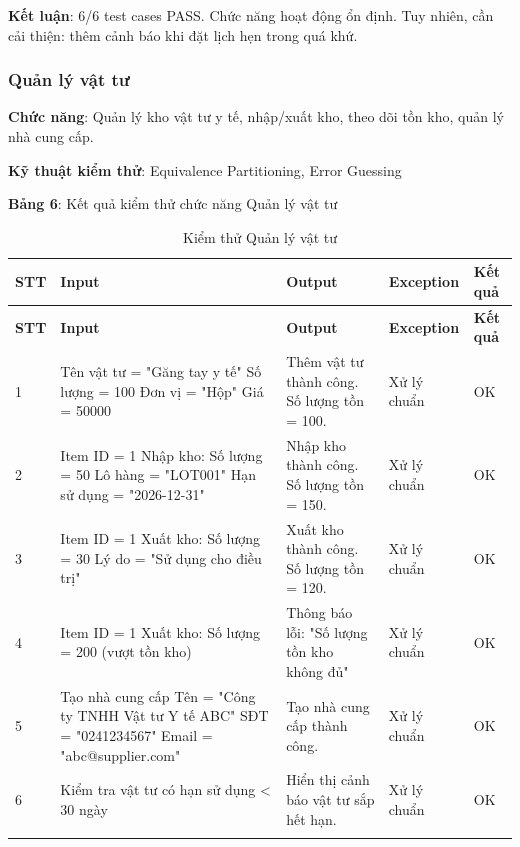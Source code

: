 \textbf{Kết luận}: 6/6 test cases PASS. Chức năng hoạt động ổn định. Tuy nhiên, cần cải thiện: thêm cảnh báo khi đặt lịch hẹn trong quá khứ.

\subsubsection{Quản lý vật tư}

\textbf{Chức năng}: Quản lý kho vật tư y tế, nhập/xuất kho, theo dõi tồn kho, quản lý nhà cung cấp.

\textbf{Kỹ thuật kiểm thử}: Equivalence Partitioning, Error Guessing

\textbf{Bảng 6}: Kết quả kiểm thử chức năng Quản lý vật tư

\begin{longtable}{|p{1cm}|p{5cm}|p{4cm}|p{3cm}|p{1.5cm}|}
\hline
\textbf{STT} & \textbf{Input} & \textbf{Output} & \textbf{Exception} & \textbf{Kết quả} \\
\hline
\endfirsthead

\hline
\textbf{STT} & \textbf{Input} & \textbf{Output} & \textbf{Exception} & \textbf{Kết quả} \\
\hline
\endhead

\hline
\endfoot

1 & Tên vật tư = "Găng tay y tế" \newline Số lượng = 100 \newline Đơn vị = "Hộp" \newline Giá = 50000 & Thêm vật tư thành công. Số lượng tồn = 100. & Xử lý chuẩn & OK \\
\hline

2 & Item ID = 1 \newline Nhập kho: Số lượng = 50 \newline Lô hàng = "LOT001" \newline Hạn sử dụng = "2026-12-31" & Nhập kho thành công. Số lượng tồn = 150. & Xử lý chuẩn & OK \\
\hline

3 & Item ID = 1 \newline Xuất kho: Số lượng = 30 \newline Lý do = "Sử dụng cho điều trị" & Xuất kho thành công. Số lượng tồn = 120. & Xử lý chuẩn & OK \\
\hline

4 & Item ID = 1 \newline Xuất kho: Số lượng = 200 (vượt tồn kho) & Thông báo lỗi: "Số lượng tồn kho không đủ" & Xử lý chuẩn & OK \\
\hline

5 & Tạo nhà cung cấp \newline Tên = "Công ty TNHH Vật tư Y tế ABC" \newline SĐT = "0241234567" \newline Email = "abc@supplier.com" & Tạo nhà cung cấp thành công. & Xử lý chuẩn & OK \\
\hline

6 & Kiểm tra vật tư có hạn sử dụng < 30 ngày & Hiển thị cảnh báo vật tư sắp hết hạn. & Xử lý chuẩn & OK \\
\hline

\caption{Kiểm thử Quản lý vật tư}
\end{longtable}

